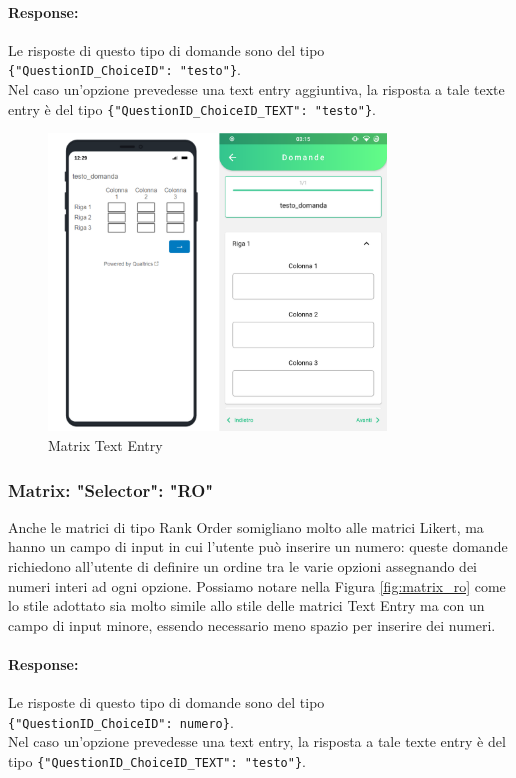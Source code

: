 \paragraph{Response:}
Le risposte di questo tipo di domande sono del tipo\\ \texttt{\{"QuestionID\_ChoiceID": "testo"\}}.\\Nel caso un'opzione prevedesse una text entry aggiuntiva, la risposta a tale texte entry è del tipo \texttt{\{"QuestionID\_ChoiceID\_TEXT": "testo"\}}.

\begin{figure}[h!]
\centering
\includegraphics[width=0.8\textwidth]{img/matrix_te}
\caption{Matrix Text Entry}
\label{fig:matrix_te}
\end{figure}

\clearpage
\subsubsection{Matrix: "Selector": "RO"}
Anche le matrici di tipo Rank Order somigliano molto alle matrici Likert, ma hanno un campo di input in cui l'utente può inserire un numero: queste domande richiedono all'utente di definire un ordine tra le varie opzioni assegnando dei numeri interi ad ogni opzione. Possiamo notare nella Figura \ref{fig:matrix_ro} come lo stile adottato sia molto simile allo stile delle matrici Text Entry ma con un campo di input minore, essendo necessario meno spazio per inserire dei numeri.

\paragraph{Response:}
Le risposte di questo tipo di domande sono del tipo\\ \texttt{\{"QuestionID\_ChoiceID": numero\}}.\\Nel caso un'opzione prevedesse una text entry, la risposta a tale texte entry è del tipo \texttt{\{"QuestionID\_ChoiceID\_TEXT": "testo"\}}.

